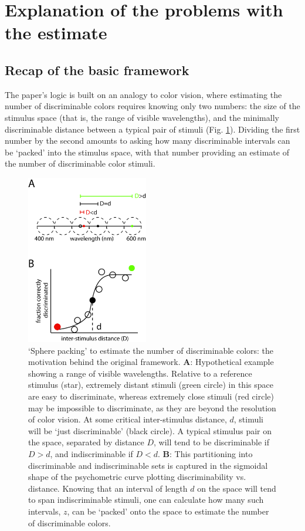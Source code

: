 \documentclass[letterpaper,twocolumn,10pt]{article}
\begin{document}
\section{Explanation of the problems with the estimate}
\label{sec:explanation}

\subsection{Recap of the basic framework}
\label{sec:recap}

The paper's logic is built on an analogy to color vision, 
where estimating the number of discriminable colors requires knowing only two numbers: 
the size of the stimulus space (that is, the range of visible wavelengths), 
and the minimally discriminable distance between a typical pair of stimuli (Fig. \ref{fig:spherepacking}). 
Dividing the first number by the second amounts to asking how many discriminable intervals can be ‘packed’ into the stimulus space, 
with that number providing an estimate of the number of discriminable color stimuli. 

\begin{figure}[!hbt]
    \centering
    \includegraphics[width=0.475\textwidth]{figures/Fig4_SpherePacking}
    \caption{
`Sphere packing' to estimate the number of discriminable colors: the motivation behind the original framework. 
\textbf{A}: Hypothetical example showing a range of visible wavelengths. 
Relative to a reference stimulus (star), extremely distant stimuli (green circle) in this space are easy to discriminate, 
whereas extremely close stimuli (red circle) may be impossible to discriminate, 
as they are beyond the resolution of color vision. 
At some critical inter-stimulus distance, $d$, 
stimuli will be `just discriminable' (black circle). 
A typical stimulus pair on the space, separated by distance $D$, 
will tend to be discriminable if $D>d$, and indiscriminable if $D<d$. 
\textbf{B}: This partitioning into discriminable and indiscriminable sets is captured in the sigmoidal shape 
of the psychometric curve plotting discriminability vs. distance. 
Knowing that an interval of length $d$ on the space will tend to span indiscriminable stimuli, 
one can calculate how many such intervals, $z$, can be `packed' onto the space
to estimate the number of discriminable colors.}
    \label{fig:spherepacking}
\end{figure}
\end{document}
